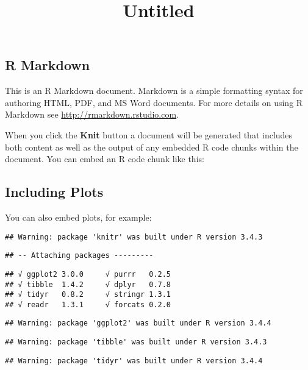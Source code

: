 \documentclass[]{article}
\title{Untitled}
\author{}
\date{}
\begin{document}
\maketitle

\subsection{R Markdown}\label{r-markdown}

This is an R Markdown document. Markdown is a simple formatting syntax
for authoring HTML, PDF, and MS Word documents. For more details on
using R Markdown see \url{http://rmarkdown.rstudio.com}.

When you click the \textbf{Knit} button a document will be generated
that includes both content as well as the output of any embedded R code
chunks within the document. You can embed an R code chunk like this:

\subsection{Including Plots}\label{including-plots}

You can also embed plots, for example:

\begin{verbatim}
## Warning: package 'knitr' was built under R version 3.4.3
\end{verbatim}

\begin{verbatim}
## -- Attaching packages ---------
\end{verbatim}

\begin{verbatim}
## √ ggplot2 3.0.0     √ purrr   0.2.5
## √ tibble  1.4.2     √ dplyr   0.7.8
## √ tidyr   0.8.2     √ stringr 1.3.1
## √ readr   1.3.1     √ forcats 0.2.0
\end{verbatim}

\begin{verbatim}
## Warning: package 'ggplot2' was built under R version 3.4.4
\end{verbatim}

\begin{verbatim}
## Warning: package 'tibble' was built under R version 3.4.3
\end{verbatim}

\begin{verbatim}
## Warning: package 'tidyr' was built under R version 3.4.4
\end{verbatim}
\end{document}
